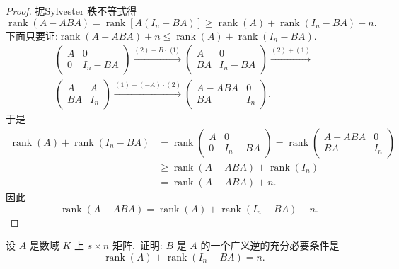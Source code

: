\begin{proof}
	据Sylvester 秩不等式得
	$$\operatorname{rank}(A-A B A)=\operatorname{rank}\left[A\left(I_{n}-B A\right)\right] \geqslant \operatorname{rank}(A)+\operatorname{rank}\left(I_{n}-B A\right)-n .$$
	下面只要证:$ \operatorname{rank}(A-A B A)+n \leqslant \operatorname{rank}(A)+\operatorname{rank}\left(I_{n}-B A\right) .$
	$$\begin{array}{c}
		\left(\begin{array}{cc}
			A & 0 \\
			0 & I_{n}-B A
		\end{array}\right) \xrightarrow{(2)+B \cdot \text { (1) }}\left(\begin{array}{cc}
			A & 0 \\
			B A & I_{n}-B A
		\end{array}\right) \xrightarrow{(2)+(1)} \\
		\left(\begin{array}{cc}
			A & A \\
			B A & I_{n}
		\end{array}\right) \xrightarrow{(1)+(-A) \cdot(2)}\left(\begin{array}{cc}
			A-A B A & 0 \\
			B A & I_{n}
		\end{array}\right) .
	\end{array}$$
	于是
	$$\begin{aligned}
		\operatorname{rank}(A)+\operatorname{rank}\left(I_{n}-B A\right) & =\operatorname{rank}\left(\begin{array}{cc}
			A & 0 \\
			0 & I_{n}-B A
		\end{array}\right)=\operatorname{rank}\left(\begin{array}{cc}
			A-A B A & 0 \\
			B A & I_{n}
		\end{array}\right) \\
		& \geqslant \operatorname{rank}(A-A B A)+\operatorname{rank}\left(I_{n}\right) \\
		& =\operatorname{rank}(A-A B A)+n .
	\end{aligned}$$
	因此 
	$$\quad \operatorname{rank}(A-A B A) =\operatorname{rank}(A)+\operatorname{rank}\left(I_{n}-B A\right)-n .$$
\end{proof}
\begin{problem}
	设  $A $ 是数域  $K $ 上  $s \times n $ 矩阵,\  证明:  $B$  是 $ A$  的一个广义逆的充分必要条件是
	$$\operatorname{rank}(A)+\operatorname{rank}\left(I_{n}-B A\right)=n .$$
\end{problem}
